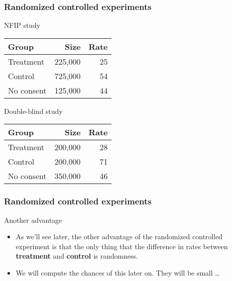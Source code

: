 \documentclass[handout]{beamer}
\begin{document}
   \begin{frame} \frametitle{Randomized controlled experiments}

   \begin{block}
   {NFIP study}
   \begin{tabular}{lrr}
   Group & Size & Rate \\ \hline
   Treatment & 225,000 & 25 \\
   Control & 725,000 & 54 \\
   No consent & 125,000 & 44
   \end{tabular}
   \end{block}


   \begin{block}
   {Double-blind study}
   \begin{tabular}{lrr}
   Group & Size & Rate \\ \hline
   Treatment & 200,000 & 28 \\
   Control & 200,000 & 71 \\
   No consent & 350,000 & 46
   \end{tabular}
   \end{block}
   \end{frame}


   \begin{frame} \frametitle{Randomized controlled experiments}

   \begin{block}
   {Another advantage}
   \begin{itemize}
   \item    As we'll see later, the other advantage of the randomized controlled experiment is that the only thing that the difference in rates between {\bf \color{red} treatment} and {\bf \color{blue} control} is randomness.


   \item    We will compute the chances of this later on. They will be small \dots
   \end{itemize}




   \end{block}
   \end{frame}

\end{document}
